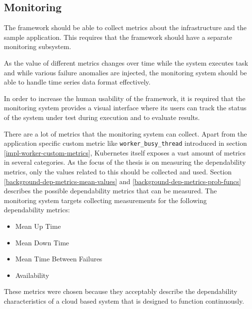 \subsection{Monitoring} \label{test-design-monitoring}

The framework should be able to collect metrics about the infrastructure and the sample application. This requires that the framework should have a separate monitoring subsystem.

As the value of different metrics changes over time while the system executes task and while various failure anomalies are injected, the monitoring system should be able to handle time series data format effectively.

In order to increase the human usability of the framework, it is required that the monitoring system provides a visual interface where its users can track the status of the system under test during execution and to evaluate results.

There are a lot of metrics that the monitoring system can collect. Apart from the application specific custom metric like \texttt{worker\_busy\_thread} introduced in section \ref{impl-worker-custom-metrics}, Kubernetes itself exposes a vast amount of metrics in several categories. As the focus of the thesis is on measuring the dependability metrics, only the values related to this should be collected and used. Section \ref{background-dep-metrics-mean-values} and \ref{background-dep-metrics-prob-funcs} describes the possible dependability metrics that can be measured. The monitoring system targets collecting measurements for the following dependability metrics:

\begin{itemize}
	\item Mean Up Time
	\item Mean Down Time
	\item Mean Time Between Failures
	\item Availability
\end{itemize}

These metrics were chosen because they acceptably describe the dependability characteristics of a cloud based system that is designed to function continuously. 

